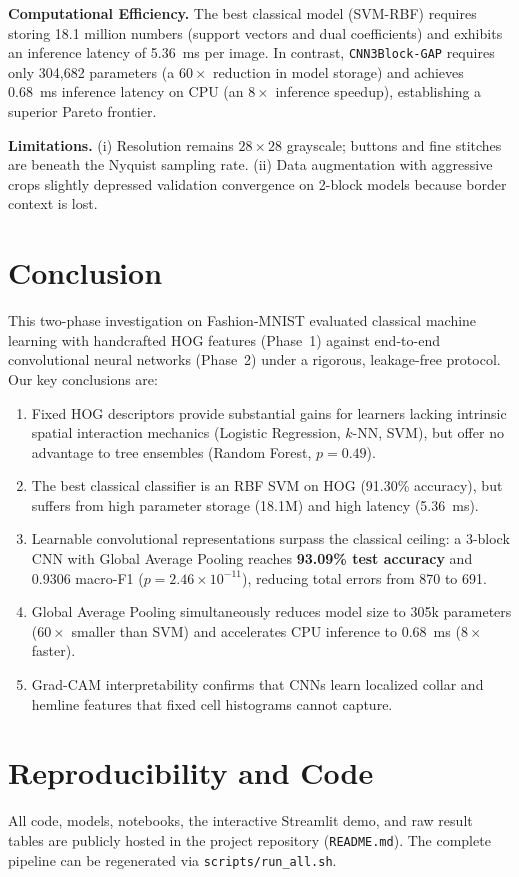 \documentclass[conference]{IEEEtran}
\begin{document}
\textbf{Computational Efficiency.} The best classical model (SVM-RBF) requires storing 18.1 million numbers (support vectors and dual coefficients) and exhibits an inference latency of 5.36~ms per image. In contrast, \texttt{CNN3Block-GAP} requires only 304{,}682 parameters (a $60\times$ reduction in model storage) and achieves 0.68~ms inference latency on CPU (an $8\times$ inference speedup), establishing a superior Pareto frontier.

\textbf{Limitations.} (i) Resolution remains $28\times28$ grayscale; buttons and fine stitches are beneath the Nyquist sampling rate. (ii) Data augmentation with aggressive crops slightly depressed validation convergence on 2-block models because border context is lost.

\section{Conclusion}
This two-phase investigation on Fashion-MNIST evaluated classical machine learning with handcrafted HOG features (Phase~1) against end-to-end convolutional neural networks (Phase~2) under a rigorous, leakage-free protocol.
Our key conclusions are:
\begin{enumerate}
\item Fixed HOG descriptors provide substantial gains for learners lacking intrinsic spatial interaction mechanics (Logistic Regression, $k$-NN, SVM), but offer no advantage to tree ensembles (Random Forest, $p=0.49$).
\item The best classical classifier is an RBF SVM on HOG (91.30\% accuracy), but suffers from high parameter storage (18.1M) and high latency (5.36~ms).
\item Learnable convolutional representations surpass the classical ceiling: a 3-block CNN with Global Average Pooling reaches \textbf{93.09\% test accuracy} and 0.9306 macro-F1 ($p = 2.46 \times 10^{-11}$), reducing total errors from 870 to 691.
\item Global Average Pooling simultaneously reduces model size to 305k parameters ($60\times$ smaller than SVM) and accelerates CPU inference to 0.68~ms ($8\times$ faster).
\item Grad-CAM interpretability confirms that CNNs learn localized collar and hemline features that fixed cell histograms cannot capture.
\end{enumerate}

\section*{Reproducibility and Code}
All code, models, notebooks, the interactive Streamlit demo, and raw result tables are publicly hosted in the project repository (\texttt{README.md}). The complete pipeline can be regenerated via \texttt{scripts/run\_all.sh}.
\end{document}
